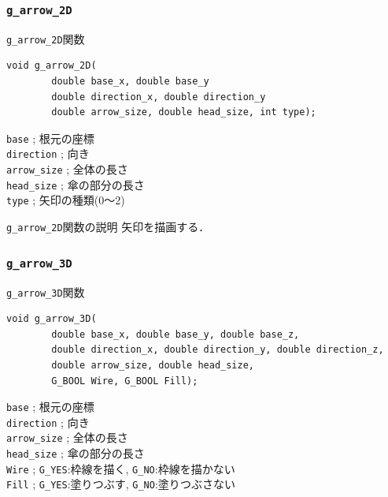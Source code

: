 \documentclass[platex,a4paper,12pt]{jsarticle}%
\begin{document}
\clearpage
\subsubsection{\texttt{g\_arrow\_2D}}

\begin{itembox}[l]{\texttt{g\_arrow\_2D}関数}
\begin{verbatim}
void g_arrow_2D(
        double base_x, double base_y
        double direction_x, double direction_y
        double arrow_size, double head_size, int type);
\end{verbatim}
\verb|base| ; 根元の座標\\
\verb|direction| ; 向き\\
\verb|arrow_size| ; 全体の長さ\\
\verb|head_size| ; 傘の部分の長さ\\
\verb|type| ; 矢印の種類(0〜2)
\end{itembox}

\begin{itembox}[l]{\texttt{g\_arrow\_2D}関数の説明}
矢印を描画する．
\end{itembox}

\begin{figure}[htb]
\end{figure}


\clearpage
\subsubsection{\texttt{g\_arrow\_3D}}

\begin{itembox}[l]{\texttt{g\_arrow\_3D}関数}
\begin{verbatim}
void g_arrow_3D(
        double base_x, double base_y, double base_z,
        double direction_x, double direction_y, double direction_z,
        double arrow_size, double head_size,
        G_BOOL Wire, G_BOOL Fill);
\end{verbatim}
\verb|base| ; 根元の座標\\
\verb|direction| ; 向き\\
\verb|arrow_size| ; 全体の長さ\\
\verb|head_size| ; 傘の部分の長さ\\
\verb|Wire| ; \verb|G_YES|:枠線を描く, \verb|G_NO|:枠線を描かない \\
\verb|Fill| ; \verb|G_YES|:塗りつぶす, \verb|G_NO|:塗りつぶさない 
\end{itembox}
\end{document}
